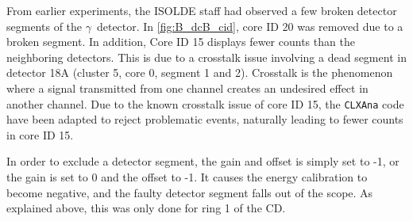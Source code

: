 \documentclass[twoside,english]{uiofysmaster/uiofysmaster}
\newcommand{\Sm}{$^{140}$Sm} %
\newcommand{\Pb}{$^{208}$Pb}
\newcommand{\ga}{$\gamma$}
\let\orgautoref\autoref
\renewcommand{\autoref}
        {%
		 \def\sectionautorefname{Section}%
		 \def\subsectionautorefname{Section}%
		 \def\subsubsectionautorefname{Section}%
		 \def\chapterautorefname{Chapter}%
          \orgautoref}
\begin{document}
From earlier experiments, the ISOLDE staff had observed a few broken detector segments of the \ga\ detector.
In \autoref{fig:B_dcB_cid}, core ID 20 was removed due to a broken segment. 
In addition, Core ID 15 displays fewer counts than the neighboring detectors.
This is due to a crosstalk issue involving a dead segment in detector 18A (cluster 5, core 0, segment 1 and 2). 
Crosstalk is the phenomenon where a signal transmitted from one channel creates an undesired effect in another channel. 
Due to the known crosstalk issue of core ID 15, the \texttt{CLXAna} code have been adapted to reject problematic events, naturally leading to fewer counts in core ID 15.

In order to exclude a detector segment, the gain and offset is simply set to -1, or the gain is set to 0 and the offset to -1.
It causes the energy calibration to become negative, and the faulty detector segment falls out of the scope. 
As explained above, this was only done for ring 1 of the CD.




\end{document}
